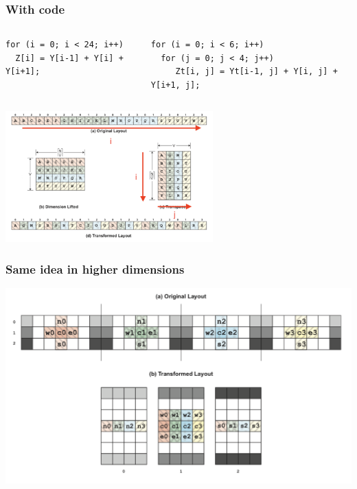 \documentclass[presentation,aspectratio=43,10pt]{beamer}
\begin{document}
\begin{frame}[fragile]
  \frametitle{With code}

  \begin{columns}
    \begin{column}{0.4\textwidth}
\begin{verbatim}
for (i = 0; i < 24; i++)
  Z[i] = Y[i-1] + Y[i] + Y[i+1];
\end{verbatim}
    \end{column}
    \begin{column}{0.6\textwidth}
\begin{verbatim}
for (i = 0; i < 6; i++)
  for (j = 0; j < 4; j++)
     Zt[i, j] = Yt[i-1, j] + Y[i, j] + Y[i+1, j];
\end{verbatim}
    \end{column}
  \end{columns}
  \begin{center}
    \includegraphics[width=0.6\textwidth]{07/1d-transpose-annotate}
  \end{center}
\end{frame}

\begin{frame}
  \frametitle{Same idea in higher dimensions}
  \begin{center}
    \includegraphics[width=\textwidth]{07/2d-transpose}
  \end{center}
\end{frame}
\end{document}
